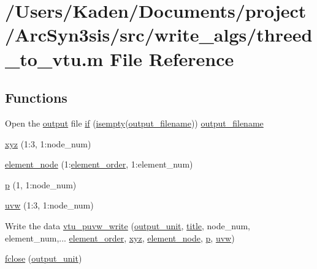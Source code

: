 \hypertarget{a00614}{}\section{/\+Users/\+Kaden/\+Documents/project/\+Arc\+Syn3sis/src/write\+\_\+algs/threed\+\_\+to\+\_\+vtu.m File Reference}
\label{a00614}
\subsection*{Functions}
\begin{DoxyCompactItemize}
\item 
Open the \hyperlink{a00623_a934120182a1459d17613528940e2bc61}{output} file \hyperlink{a00614_a96c738d3e2120c4273f9d4390761d99e}{if} (\hyperlink{a00608_ad2a182e2e8932167c056732723f13e1c}{isempty}(\hyperlink{a00617_a5934d690c688edbd92210f38fe5855e7}{output\+\_\+filename})) \hyperlink{a00617_a5934d690c688edbd92210f38fe5855e7}{output\+\_\+filename}
\item 
\hyperlink{a00614_a6444a221e6b74abaf6d67d44af2650a0}{xyz} (1\+:3, 1\+:node\+\_\+num)
\item 
\hyperlink{a00614_a50df015479692caa32ea5ed86939881e}{element\+\_\+node} (1\+:\hyperlink{a00611_aa77ee84ffb15118601acbd018f243edc}{element\+\_\+order}, 1\+:element\+\_\+num)
\item 
\hyperlink{a00614_a1e0420801cd5156c14e085b87a4945f5}{p} (1, 1\+:node\+\_\+num)
\item 
\hyperlink{a00614_ac062c50cc1b43901b7ea410ae1ff3be9}{uvw} (1\+:3, 1\+:node\+\_\+num)
\item 
Write the data \hyperlink{a00614_ad3b8b2bdff5bbed5ed9577cf6c917324}{vtu\+\_\+puvw\+\_\+write} (\hyperlink{a00614_a21b113ecd24e6ae8a92fa4a149ad8701}{output\+\_\+unit}, \hyperlink{a00617_a051e403214cb6872ad3fe4e50302a6ee}{title}, node\+\_\+num, element\+\_\+num,... \hyperlink{a00611_aa77ee84ffb15118601acbd018f243edc}{element\+\_\+order}, \hyperlink{a00614_a6444a221e6b74abaf6d67d44af2650a0}{xyz}, \hyperlink{a00614_a50df015479692caa32ea5ed86939881e}{element\+\_\+node}, \hyperlink{a00614_a1e0420801cd5156c14e085b87a4945f5}{p}, \hyperlink{a00614_ac062c50cc1b43901b7ea410ae1ff3be9}{uvw})
\item 
\hyperlink{a00614_a5b2ddd49b09b4e4843a4643822a0272a}{fclose} (\hyperlink{a00614_a21b113ecd24e6ae8a92fa4a149ad8701}{output\+\_\+unit})
\item 

\end{DoxyCompactItemize}
